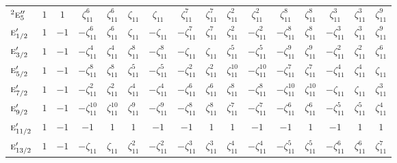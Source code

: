 \documentclass[10pt,a4paper]{article}
\makeatletter
\def\grouprule#1#2{\noalign{\marks\LTgroupmarks{\the\belowrulesep}\nobreak\vskip#1%
  \vskip\aboverulesep}\multispan\LT@cols\unskip{\leaders\hrule\@height#2\hfill\kern\z@}\cr
  \noalign{\penalty\LTrulebreak\vskip\belowrulesep\global\@lastruleclass\z@}}
\numberwithin{equation}{section}
\newcommand{\irr}[1]{\text{\normalfont\scshape #1}}
\newcommand{\conjpair}[1]{{}^{#1}}
\newcommand{\rootunity}[1]{\zeta_{#1}}
\makeatother
\begin{document}
{\begin{longtable}{@{}lccccccccccccccc@{}}
$\conjpair{2}\irr{e}_{5}''$ & $1$ & $1$ & $\rootunity{11}^{6}$ & $\rootunity{11}^{6}$ & $\rootunity{11}$ & $\rootunity{11}$ & $\rootunity{11}^{7}$ & $\rootunity{11}^{7}$ & $\rootunity{11}^{2}$ & $\rootunity{11}^{2}$ & $\rootunity{11}^{8}$ & $\rootunity{11}^{8}$ & $\rootunity{11}^{3}$ & $\rootunity{11}^{3}$ & $\rootunity{11}^{9}$\\
\grouprule{0pt}{\lightrulewidth}
$\irr{e}_{1/2}'$ & $1$ & $-1$ & $-\rootunity{11}^{6}$ & $\rootunity{11}^{6}$ & $\rootunity{11}$ & $-\rootunity{11}$ & $-\rootunity{11}^{7}$ & $\rootunity{11}^{7}$ & $\rootunity{11}^{2}$ & $-\rootunity{11}^{2}$ & $-\rootunity{11}^{8}$ & $\rootunity{11}^{8}$ & $-\rootunity{11}^{3}$ & $\rootunity{11}^{3}$ & $\rootunity{11}^{9}$\\
$\irr{e}_{3/2}'$ & $1$ & $-1$ & $-\rootunity{11}^{4}$ & $\rootunity{11}^{4}$ & $\rootunity{11}^{8}$ & $-\rootunity{11}^{8}$ & $-\rootunity{11}$ & $\rootunity{11}$ & $\rootunity{11}^{5}$ & $-\rootunity{11}^{5}$ & $-\rootunity{11}^{9}$ & $\rootunity{11}^{9}$ & $-\rootunity{11}^{2}$ & $\rootunity{11}^{2}$ & $\rootunity{11}^{6}$\\
$\irr{e}_{5/2}'$ & $1$ & $-1$ & $-\rootunity{11}^{8}$ & $\rootunity{11}^{8}$ & $\rootunity{11}^{5}$ & $-\rootunity{11}^{5}$ & $-\rootunity{11}^{2}$ & $\rootunity{11}^{2}$ & $\rootunity{11}^{10}$ & $-\rootunity{11}^{10}$ & $-\rootunity{11}^{7}$ & $\rootunity{11}^{7}$ & $-\rootunity{11}^{4}$ & $\rootunity{11}^{4}$ & $\rootunity{11}$\\
$\irr{e}_{7/2}'$ & $1$ & $-1$ & $-\rootunity{11}^{2}$ & $\rootunity{11}^{2}$ & $\rootunity{11}^{4}$ & $-\rootunity{11}^{4}$ & $-\rootunity{11}^{6}$ & $\rootunity{11}^{6}$ & $\rootunity{11}^{8}$ & $-\rootunity{11}^{8}$ & $-\rootunity{11}^{10}$ & $\rootunity{11}^{10}$ & $-\rootunity{11}$ & $\rootunity{11}$ & $\rootunity{11}^{3}$\\
$\irr{e}_{9/2}'$ & $1$ & $-1$ & $-\rootunity{11}^{10}$ & $\rootunity{11}^{10}$ & $\rootunity{11}^{9}$ & $-\rootunity{11}^{9}$ & $-\rootunity{11}^{8}$ & $\rootunity{11}^{8}$ & $\rootunity{11}^{7}$ & $-\rootunity{11}^{7}$ & $-\rootunity{11}^{6}$ & $\rootunity{11}^{6}$ & $-\rootunity{11}^{5}$ & $\rootunity{11}^{5}$ & $\rootunity{11}^{4}$\\
$\irr{e}_{11/2}'$ & $1$ & $-1$ & $-1$ & $1$ & $1$ & $-1$ & $-1$ & $1$ & $1$ & $-1$ & $-1$ & $1$ & $-1$ & $1$ & $1$\\
$\irr{e}_{13/2}'$ & $1$ & $-1$ & $-\rootunity{11}$ & $\rootunity{11}$ & $\rootunity{11}^{2}$ & $-\rootunity{11}^{2}$ & $-\rootunity{11}^{3}$ & $\rootunity{11}^{3}$ & $\rootunity{11}^{4}$ & $-\rootunity{11}^{4}$ & $-\rootunity{11}^{5}$ & $\rootunity{11}^{5}$ & $-\rootunity{11}^{6}$ & $\rootunity{11}^{6}$ & $\rootunity{11}^{7}$\\

\end{longtable}}
\end{document}
